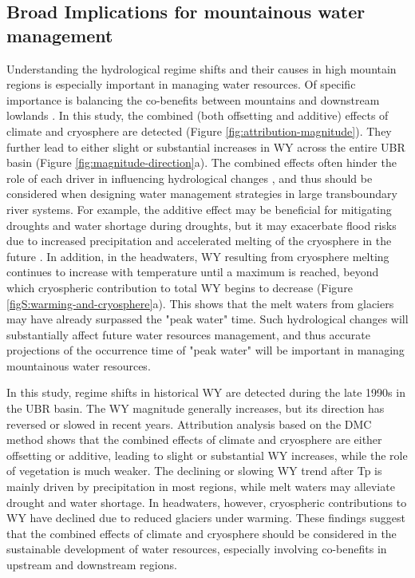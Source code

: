 \documentclass[hess, manuscript]{copernicus}
\begin{document}
\subsection{Broad Implications for mountainous water management}
Understanding the hydrological regime shifts and their causes in high mountain regions is especially important in managing water resources. Of specific importance is balancing the co-benefits between mountains and downstream lowlands \citep{viviroli2011climate}. In this study, the combined (both offsetting and additive) effects of climate and cryosphere are detected (Figure \ref{fig:attribution-magnitude}). They further lead to either slight or substantial increases in WY across the entire UBR basin (Figure \ref{fig:magnitude-direction}a). The combined effects often hinder the role of each driver in influencing hydrological changes \citep{wei2018,zhang2021deforestation}, and thus should be considered when designing water management strategies in large transboundary river systems. For example, the additive effect may be beneficial for mitigating droughts and water shortage during droughts, but it may exacerbate flood risks due to increased precipitation and accelerated melting of the cryosphere in the future \citep{Immerzeel2013}. In addition, in the headwaters, WY resulting from cryosphere melting continues to increase with temperature until a maximum is reached, beyond which cryospheric contribution to total WY begins to decrease (Figure \ref{figS:warming-and-cryosphere}a). This shows that the melt waters from glaciers may have already surpassed the "peak water" time. Such hydrological changes will substantially affect future water resources management, and thus accurate projections of the occurrence time of "peak water" will be important in managing mountainous water resources.

\conclusions 
In this study, regime shifts in historical WY are detected during the late 1990s in the UBR basin. The WY magnitude generally increases, but its direction has reversed or slowed in recent years. Attribution analysis based on the DMC method shows that the combined effects of climate and cryosphere are either offsetting or additive, leading to slight or substantial WY increases, while the role of vegetation is much weaker. The declining or slowing WY trend after Tp is mainly driven by precipitation in most regions, while melt waters may alleviate drought and water shortage. In headwaters, however, cryospheric contributions to WY have declined due to reduced glaciers under warming. These findings suggest that the combined effects of climate and cryosphere should be considered in the sustainable development of water resources, especially involving co-benefits in upstream and downstream regions.
\end{document}
